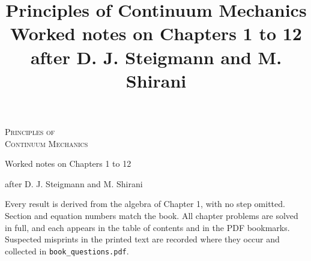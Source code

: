 \documentclass[17pt,a4paper,openany]{extreport}
\title{Principles of Continuum Mechanics\\[3mm]
\large Worked notes on Chapters 1 to 12\\[2mm]
\large after D. J. Steigmann and M. Shirani}
\author{}
\date{}
\theoremstyle{scplain}
\theoremstyle{scdefn}
\begin{document}
\begin{titlepage}
\centering
\vspace*{3cm}
{\Huge\scshape Principles of\\[3mm] Continuum Mechanics\par}
\vspace{1.2cm}
{\LARGE Worked notes on Chapters 1 to 12\par}
\vspace{0.8cm}
{\large after D. J. Steigmann and M. Shirani\par}
\vspace{1.8cm}
\begin{minipage}{0.86\textwidth}
{\large Every result is derived from the algebra of Chapter 1, with no
step omitted. Section and equation numbers match the book. All chapter
problems are solved in full, and each appears in the table of contents and
in the PDF bookmarks. Suspected misprints in the printed text are recorded
where they occur and collected in \texttt{book\_questions.pdf}.\par}
\end{minipage}
\vfill
\end{titlepage}

\tableofcontents
\cleardoublepage
{}















\appendix

\end{document}
